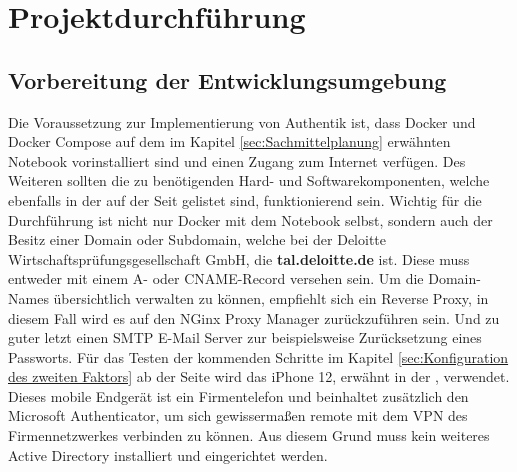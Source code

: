 \section{Projektdurchführung} 
\label{sec:Projektdurchführung}

\subsection{Vorbereitung der Entwicklungsumgebung}
\label{sec:Vorbereitung der Entwicklungsumgebung}
Die Voraussetzung zur Implementierung von Authentik ist, dass Docker und Docker Compose auf dem im Kapitel \ref{sec:Sachmittelplanung} 
 erwähnten Notebook vorinstalliert sind und einen Zugang zum Internet verfügen. Des Weiteren sollten die zu 
benötigenden Hard- und Softwarekomponenten, welche ebenfalls in der  auf der Seit \pageref{sec:Sachmittelplanung} 
gelistet sind, funktionierend sein. Wichtig für die Durchführung ist nicht nur Docker mit dem Notebook selbst, sondern auch der 
Besitz einer Domain oder Subdomain, welche bei der Deloitte Wirtschaftsprüfungsgesellschaft GmbH, die \textbf{tal.deloitte.de} ist. 
Diese muss entweder mit einem A- oder CNAME-Record versehen sein. Um die Domain-Names übersichtlich verwalten zu können, 
empfiehlt sich ein Reverse Proxy, in diesem Fall wird es auf den NGinx Proxy Manager zurückzuführen sein. Und zu guter letzt einen SMTP 
E-Mail Server zur beispielsweise Zurücksetzung eines Passworts. Für das Testen der kommenden Schritte im Kapitel 
\ref{sec:Konfiguration des zweiten Faktors}  ab der Seite 
\pageref{sec:Konfiguration des zweiten Faktors} wird das iPhone 12, erwähnt in der , verwendet. 
Dieses mobile Endgerät ist ein Firmentelefon und beinhaltet zusätzlich den Microsoft Authenticator, um sich 
gewissermaßen remote mit dem VPN des Firmennetzwerkes verbinden zu können. Aus diesem Grund muss kein weiteres Active Directory 
installiert und eingerichtet werden.

